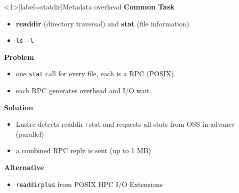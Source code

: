 \begin{frame}<1>[label=statdir]{Metadata overhead}
    \textbf{Common Task}
    \begin{itemize}
        \item \textbf{readdir} (directory traversal) and \textbf{stat} (file information)
        \item \texttt{ls -l}
    \end{itemize}

    \textbf{Problem}
    \begin{itemize}
        \item one \texttt{stat} call for every file, each is a RPC (POSIX).
        \item each RPC generates overhead and I/O wait
    \end{itemize}

    \textbf{Solution}
    \begin{itemize}
        \item Lustre detects readdir+stat and requests all stats from OSS in advance (parallel)
        \item a combined RPC reply is sent (up to 1 MB)
    \end{itemize}

    \pause

    \textbf{Alternative}
    \begin{itemize}
        \item \texttt{readdirplus} from POSIX HPC I/O Extensions \cite{posix-ext}
    \end{itemize}
\end{frame}

